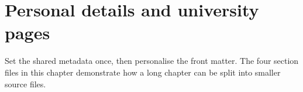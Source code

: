 
\chapter{Personal details and university pages}\label{chap:02}
\renewcommand{\FigLocation}{Chapters/Chapter_2/fig/}
\renewcommand{\ChapLocation}{Chapters/Chapter_2/}
\begin{absbox}
Set the shared metadata once, then personalise the front matter. The four section files in this chapter demonstrate how a long chapter can be split into smaller source files.
\end{absbox}





